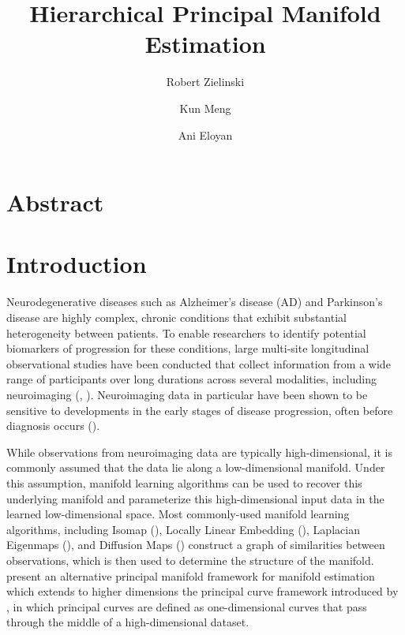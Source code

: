 \documentclass[11pt,reqno]{article}
\theoremstyle{definition}
\begin{document}
\title{Hierarchical Principal Manifold Estimation}
\author[1]{Robert Zielinski}
\author[2]{Kun Meng}
\author[1]{Ani Eloyan}



\maketitle

\doublespacing

\section{Abstract} \label{s:abstract}

\section{Introduction}

Neurodegenerative diseases such as Alzheimer's disease (AD) and Parkinson's disease are highly complex, chronic conditions that exhibit substantial heterogeneity between patients. To enable researchers to identify potential biomarkers of progression for these conditions, large multi-site longitudinal observational studies have been conducted that collect information from a wide range of participants over long durations across several modalities, including neuroimaging (\cite{muellerWaysEarlyDiagnosis2005}, \cite{marekParkinsonProgressionMarker2011}). Neuroimaging data in particular have been shown to be sensitive to developments in the early stages of disease progression, often before diagnosis occurs (\cite{jackHypotheticalModelDynamic2010}).

While observations from neuroimaging data are typically high-dimensional, it is commonly assumed that the data lie along a low-dimensional manifold. Under this assumption, manifold learning algorithms can be used to recover this underlying manifold and parameterize this high-dimensional input data in the learned low-dimensional space. Most commonly-used manifold learning algorithms, including Isomap (\cite{tenenbaumGlobalGeometricFramework2000}), Locally Linear Embedding (\cite{roweisNonlinearDimensionalityReduction2000}), Laplacian Eigenmaps (\cite{belkinLaplacianEigenmapsDimensionality2003}), and Diffusion Maps (\cite{coifmanDiffusionMaps2006}) construct a graph of similarities between observations, which is then used to determine the structure of the manifold. \cite{mengPrincipalManifoldEstimation2021} present an alternative principal manifold framework for manifold estimation which extends to higher dimensions the principal curve framework introduced by \cite{hastiePrincipalCurves1989}, in which principal curves are defined as one-dimensional curves that pass through the middle of a high-dimensional dataset. 
\end{document}
